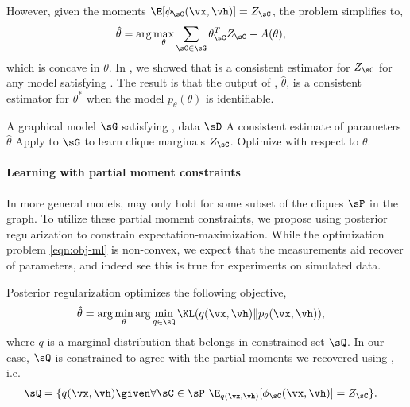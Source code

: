 However, given the moments $\E[ \phi_\sC(\vx,\vh) ] = Z_\sC$, the
  problem simplifies to,
\begin{align}
  \hat \theta 
  &= \arg\max_{\theta} \sum_{\sC \in \sG} \theta_\sC^T Z_\sC - A(\theta), \label{eqn:obj}
\end{align}
which is concave in $\theta$.
In , we showed that \LearnMarginals is a consistent
  estimator for $Z_\sC$ for any model satisfying . 
The result is that the output of , $\hat\theta$, is a consistent estimator for $\theta^*$
  when the model $p_\theta(\theta)$ is identifiable.

\renewcommand{\algorithmicrequire}{\textbf{Input:}}
\renewcommand{\algorithmicensure}{\textbf{Output:}}
\begin{algorithm}
  \caption{\LearnLogLinear}
  \label{algo:undirected}
  \begin{algorithmic}
    \REQUIRE A graphical model $\sG$ satisfying , data $\sD$
    \ENSURE A consistent estimate of parameters $\hat \theta$
      \STATE Apply \LearnMarginals to $\sG$ to learn clique marginals $Z_\sC$.
      \STATE Optimize  with respect to $\theta$.
  \end{algorithmic}
\end{algorithm}

\paragraph{Learning with partial moment constraints}

In more general models,  may only hold for
  some subset of the cliques $\sP$ in the graph.
To utilize these partial moment constraints, we propose using posterior
  regularization \citep{graca08em} to constrain expectation-maximization.
While the optimization problem \eqref{eqn:obj-ml} is non-convex, we
  expect that the measurements aid recover of parameters, and indeed see
  this is true for experiments on simulated data.

Posterior regularization optimizes the following objective,
\begin{align*}
  \hat \theta &= \arg\min_{\theta} \arg\min_{q \in \sQ} \KL( q(\vx,\vh) \| p_{\theta}(\vx, \vh) ),
\end{align*}
where $q$ is a marginal distribution that belongs in constrained set
$\sQ$. In our case, $\sQ$ is constrained to agree with the partial
moments we recovered using \LearnMarginals, i.e. 
\begin{align*}
  \sQ &= \{ q(\vx,\vh) \given \forall \sC \in \sP ~ \E_{q(\vx,\vh)}[\phi_\sC(\vx, \vh)] = Z_\sC \}.
\end{align*}

